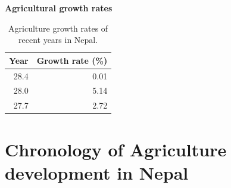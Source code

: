 \documentclass[
  openany]{book}
\begin{document}
\textbf{Agricultural growth rates}

\begin{table}

\caption{\label{tab:unnamed-chunk-3}Agriculture growth rates of recent years in Nepal.}
\centering
\begin{tabular}[t]{rr}
\toprule
Year & Growth rate (\%)\\
\midrule
\rowcolor{gray!6}  28.4 & 0.01\\
28.0 & 5.14\\
\rowcolor{gray!6}  27.7 & 2.72\\
\bottomrule
\end{tabular}
\end{table}

\hypertarget{chronology-of-agriculture-development-in-nepal}{%
\section{Chronology of Agriculture development in Nepal}\label{chronology-of-agriculture-development-in-nepal}}
\end{document}
